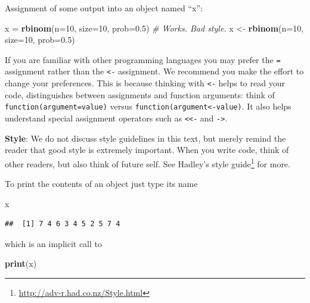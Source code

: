 \documentclass[]{book}
\newenvironment{Shaded}{\begin{snugshade}}{\end{snugshade}}
\newcommand{\CommentTok}[1]{\textcolor[rgb]{0.56,0.35,0.01}{\textit{#1}}}
\newcommand{\DataTypeTok}[1]{\textcolor[rgb]{0.13,0.29,0.53}{#1}}
\newcommand{\DecValTok}[1]{\textcolor[rgb]{0.00,0.00,0.81}{#1}}
\newcommand{\FloatTok}[1]{\textcolor[rgb]{0.00,0.00,0.81}{#1}}
\newcommand{\KeywordTok}[1]{\textcolor[rgb]{0.13,0.29,0.53}{\textbf{#1}}}
\newcommand{\NormalTok}[1]{#1}
\newcommand{\StringTok}[1]{\textcolor[rgb]{0.31,0.60,0.02}{#1}}
\renewcommand{\href}[2]{#2\footnote{\url{#1}}}
\theoremstyle{definition}
\theoremstyle{definition}
\theoremstyle{definition}
\theoremstyle{remark}
\let\BeginKnitrBlock\begin \let\EndKnitrBlock\end
\begin{document}
Assignment of some output into an object named ``x'':

\begin{Shaded}
\begin{Highlighting}[]
\NormalTok{x =}\StringTok{ }\KeywordTok{rbinom}\NormalTok{(}\DataTypeTok{n=}\DecValTok{10}\NormalTok{, }\DataTypeTok{size=}\DecValTok{10}\NormalTok{, }\DataTypeTok{prob=}\FloatTok{0.5}\NormalTok{) }\CommentTok{# Works. Bad style.}
\NormalTok{x <-}\StringTok{ }\KeywordTok{rbinom}\NormalTok{(}\DataTypeTok{n=}\DecValTok{10}\NormalTok{, }\DataTypeTok{size=}\DecValTok{10}\NormalTok{, }\DataTypeTok{prob=}\FloatTok{0.5}\NormalTok{) }
\end{Highlighting}
\end{Shaded}

If you are familiar with other programming languages you may prefer the \texttt{=} assignment rather than the \texttt{\textless{}-} assignment.
We recommend you make the effort to change your preferences.
This is because thinking with \texttt{\textless{}-} helps to read your code, distinguishes between assignments and function arguments: think of \texttt{function(argument=value)} versus \texttt{function(argument\textless{}-value)}.
It also helps understand special assignment operators such as \texttt{\textless{}\textless{}-} and \texttt{-\textgreater{}}.

\BeginKnitrBlock{remark}
{}\textbf{Style}:
We do not discuss style guidelines in this text, but merely remind the reader that good style is extremely important. When you write code, think of other readers, but also think of future self.
See \href{http://adv-r.had.co.nz/Style.html}{Hadley's style guide} for more.
\EndKnitrBlock{remark}

To print the contents of an object just type its name

\begin{Shaded}
\begin{Highlighting}[]
\NormalTok{x}
\end{Highlighting}
\end{Shaded}

\begin{verbatim}
##  [1] 7 4 6 3 4 5 2 5 7 4
\end{verbatim}

which is an implicit call to

\begin{Shaded}
\begin{Highlighting}[]
\KeywordTok{print}\NormalTok{(x)  }
\end{Highlighting}
\end{Shaded}
\end{document}
